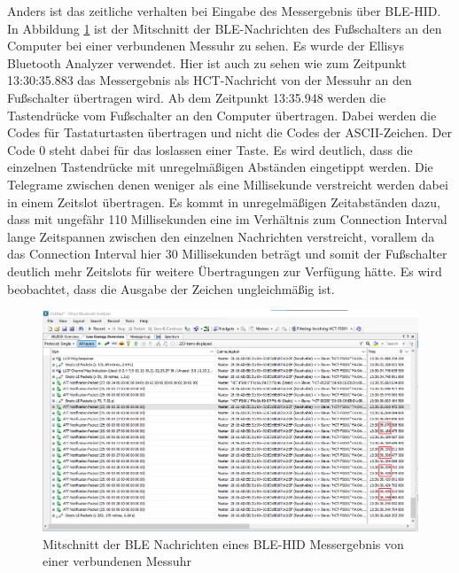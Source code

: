 Anders ist das zeitliche verhalten bei Eingabe des Messergebnis über BLE-HID. In Abbildung \ref{fig:MitschnittEinerMessuhr} ist der Mitschnitt der BLE-Nachrichten des Fußschalters an den Computer bei einer verbundenen Messuhr zu sehen. Es wurde der Ellisys Bluetooth Analyzer verwendet. Hier ist auch zu sehen wie zum Zeitpunkt 13:30:35.883 das Messergebnis als HCT-Nachricht von der Messuhr an den Fußschalter übertragen wird. Ab dem Zeitpunkt 13:35.948 werden die Tastendrücke vom Fußschalter an den Computer übertragen. Dabei werden die Codes für Tastaturtasten übertragen und nicht die Codes der ASCII-Zeichen. Der Code 0 steht dabei für das loslassen einer Taste. Es wird deutlich, dass die einzelnen Tastendrücke mit unregelmäßigen Abständen eingetippt werden. Die Telegrame zwischen denen weniger als eine Millisekunde verstreicht werden dabei in einem Zeitslot übertragen. Es kommt in unregelmäßigen Zeitabständen dazu, dass mit ungefähr 110 Millisekunden eine im Verhältnis zum Connection Interval lange Zeitspannen zwischen den einzelnen Nachrichten verstreicht, vorallem da das Connection Interval hier 30 Millisekunden beträgt und somit der Fußschalter deutlich mehr Zeitslots für weitere Übertragungen zur Verfügung hätte. Es wird beobachtet, dass die Ausgabe der Zeichen ungleichmäßig ist.
\begin{figure}[H] 
	\centering
	\includegraphics[width=\textwidth]{figures/BLEHID1device.png}
	\caption{Mitschnitt der BLE Nachrichten eines BLE-HID Messergebnis von einer verbundenen Messuhr}
	\label{fig:MitschnittEinerMessuhr}
\end{figure}

